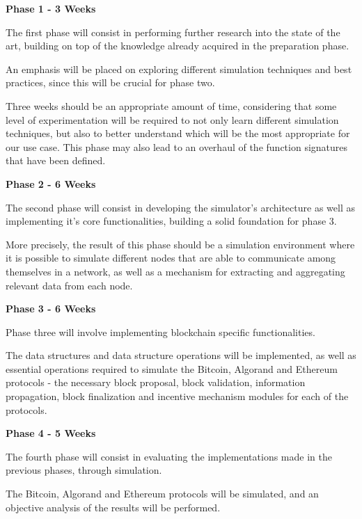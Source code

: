\newpage

\textbf{Phase 1 - 3 Weeks}

The first phase will consist in performing further research into the state of the art, building on top of the knowledge already acquired in the preparation phase.

An emphasis will be placed on exploring different simulation techniques and best practices, since this will be crucial for phase two.

Three weeks should be an appropriate amount of time, considering that some level of experimentation will be required to not only learn different simulation techniques, but also to better understand which will be the most appropriate for our use case. This phase may also lead to an overhaul of the function signatures that have been defined.

\vspace{0.25cm}

\textbf{Phase 2 - 6 Weeks}

The second phase will consist in developing the simulator's architecture as well as implementing it's core functionalities, building a solid foundation for phase 3.

More precisely, the result of this phase should be a simulation environment where it is possible to simulate different nodes that are able to communicate among themselves in a network, as well as a mechanism for extracting and aggregating relevant data from each node.

\vspace{0.25cm}

\textbf{Phase 3 - 6 Weeks}

Phase three will involve implementing blockchain specific functionalities. 

The data structures and data structure operations will be implemented, as well as essential operations required to simulate the Bitcoin, Algorand and Ethereum protocols - the necessary block proposal, block validation, information propagation, block finalization and incentive mechanism modules for each of the protocols.

\vspace{0.25cm}

\textbf{Phase 4 - 5 Weeks}

The fourth phase will consist in evaluating the implementations made in the previous phases, through simulation.

The Bitcoin, Algorand and Ethereum protocols will be simulated, and an objective analysis of the results will be performed.

